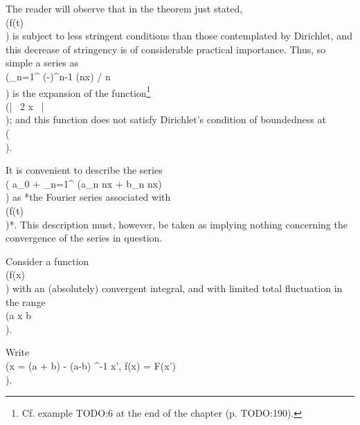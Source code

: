The reader will observe that in the theorem just stated,
\\(f(t)\\) is subject to less stringent conditions than those contemplated by
Dirichlet, and this decrease of stringency is of
considerable practical importance. Thus, so simple a series as
\\(\sum_{n=1}^{\infty} (-)^{n-1} (\cos nx) / n\\)
is the
expansion of the function\footnote{Cf. example TODO:6 at the end of the chapter (p. TODO:190).}
\\(\log \left| \, 2 \cos {} x \, \right| \\); and this function
does not satisfy Dirichlet's condition of boundedness at \\(\pm \pi\\).

It is convenient to describe the series
\\( a_{0} + \sum_{n=1}^{\infty} (a_{n} \cos nx + b_{n} \sin nx)\\)
as *the Fourier series associated with \\(f(t)\\)*. This description must,
however, be
%
%
taken as implying nothing concerning the convergence of the series in
question.


Consider a function \\(f(x)\\) with an (absolutely) convergent integral,
and with limited total fluctuation in the range \\(a \leq x \leq b\\).

Write
\\(x =  (a + b) -  (a-b) \pi^{-1} x',
\quad
f(x) = F(x')\\).

